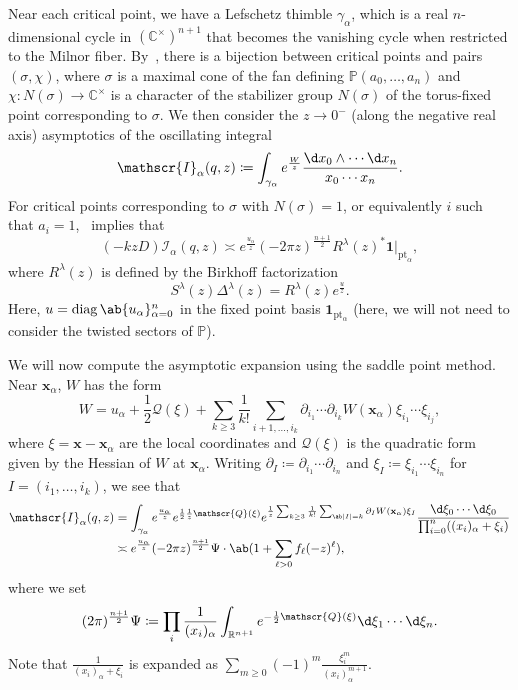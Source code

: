 \documentclass[10pt]{amsart}
\theoremstyle{definition}
\theoremstyle{remark}
\theoremstyle{plain}
\theoremstyle{definition}
\theoremstyle{remark}
\newcommand{\R}{\mathbb{R}}
\newcommand{\C}{\mathbb{C}}
\renewcommand{\P}{\mathbb{P}}
\newcommand{\msc}[1]{\mathscr{#1}}
\newcommand{\mbf}[1]{\mathbf{#1}}
\newcommand{\mr}[1]{\mathrm{#1}}
\newcommand{\on}[1]{\operatorname{#1}}
\newcommand{\1}{\mathbf{1}}
\newcommand{\2}{\mathbf{2}}
\newcommand{\3}{\mathbf{3}}
\newcommand{\pt}{\mr{pt}}
\numberwithin{equation}{section}
\begin{document}
Near each critical point, we have a Lefschetz thimble $\gamma_{\alpha}$, which is a real $n$-dimensional cycle in $(\C^{\times})^{n+1}$ that becomes the vanishing cycle when restricted to the Milnor fiber. By~\cite[Lemma 6.2]{htmstoric}, there is a bijection between critical points and pairs $(\sigma, \chi)$, where $\sigma$ is a maximal cone of the fan defining $\P(a_0, \ldots, a_n)$ and $\chi \colon N(\sigma) \to \C^{\times}$ is a character of the stabilizer group $N(\sigma)$ of the torus-fixed point corresponding to $\sigma$. We then consider the $z \to 0^-$ (along the negative real axis) asymptotics of the oscillating integral
\[ \msc{I}_{\alpha}(q,z) \coloneqq \int_{\gamma_{\alpha}} e^{\frac{W}{z}} \frac{\d x_0 \wedge \cdots \d x_n}{x_0 \cdots x_n}. \]
For critical points corresponding to $\sigma$ with $N(\sigma) = 1$, or equivalently $i$ such that $a_i = 1$,~\cite[Proposition 6.9]{htmstoric} implies that
\[ (-kzD) \msc{I}_{\alpha}(q,z) \asymp e^{\frac{u_{\alpha}}{z}} (-2\pi z)^{\frac{n+1}{2}} R^{\lambda}(z)^* \1|_{\pt_{\alpha}}, \]
where $R^{\lambda}(z)$ is defined by the Birkhoff factorization
\begin{equation}\label{eqn:rmattwisted} S^{\lambda}(z) \Delta^{\lambda}(z) = R^{\lambda}(z) e^{\frac{u}{z}}. \end{equation}
Here, $u = \on{diag} \ab\{u_{\alpha}\}_{\alpha=0}^n$ in the fixed point basis $\1_{\pt_{\alpha}}$ (here, we will not need to consider the twisted sectors of $\P$).

We will now compute the asymptotic expansion using the saddle point method. Near $\mbf{x}_{\alpha}$, $W$ has the form
\[ W = u_{\alpha} + \frac{1}{2} \msc{Q}(\xi) + \sum_{k \geq 3} \frac{1}{k!} \sum_{i+1, \ldots, i_k} \partial_{i_1} \cdots \partial_{i_k} W(\mbf{x}_{\alpha}) \xi_{i_1} \cdots \xi_{i_j}, \]
where $\xi = \mbf{x} - \mbf{x}_{\alpha}$ are the local coordinates and $\msc{Q}(\xi)$ is the quadratic form given by the Hessian of $W$ at $\mbf{x}_{\alpha}$. Writing $\partial_I \coloneqq \partial_{i_1} \cdots \partial_{i_n}$ and $\xi_I \coloneqq \xi_{i_1} \cdots \xi_{i_n}$ for $I = (i_1, \ldots, i_k)$, we see that
\begin{align*}
    \msc{I}_{\alpha}(q,z) &= \int_{\gamma_{\alpha}} e^{\frac{u_{\alpha}}{z}} e^{\frac{1}{2} \frac{1}{z} \msc{Q}(\xi)} e^{\frac{1}{z}\sum_{k \geq 3} \frac{1}{k!} \sum_{\ab|I| = k} \partial_I W(\mbf{x}_{\alpha}) \xi_I} \frac{\d \xi_0 \cdots \d\xi_0}{\prod_{i=0}^n ((x_i)_{\alpha} + \xi_i)} \\
    &\asymp e^{\frac{u_{\alpha}}{z}}(-2\pi z)^{\frac{n+1}{2}} \Psi \cdot \ab(1 + \sum_{\ell > 0} f_{\ell}(-z)^{\ell}),
\end{align*}
where we set
\[ (2\pi)^{\frac{n+1}{2}}\Psi \coloneqq \prod_i \frac{1}{( x_i )_{\alpha}} \int_{\R^{n+1}} e^{-\frac{1}{2} \msc{Q}(\xi)} \d \xi_1 \cdots \d\xi_n. \]
Note that $\frac{1}{(x_i)_{\alpha} + \xi_i}$ is expanded as $\sum_{m\geq 0} (-1)^m \frac{\xi_i^m}{(x_i)_{\alpha}^{m+1}}$.
\end{document}
